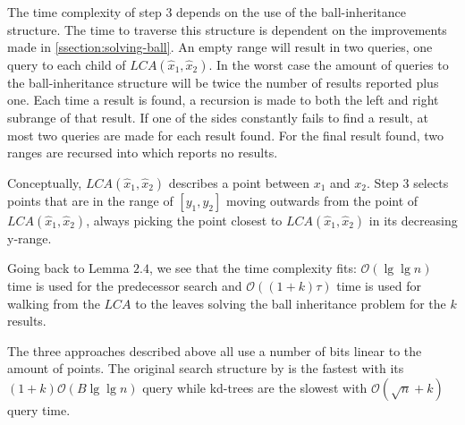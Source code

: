 The time complexity of step $3$ depends on the use of the ball-inheritance structure. The time to traverse this structure is dependent on the improvements made in \ref{ssection:solving-ball}. An empty range will result in two queries, one query to each child of $LCA(\hat{x}_1, \hat{x}_2)$. In the worst case the amount of queries to the ball-inheritance structure will be twice the number of results reported plus one. Each time a result is found, a recursion is made to both the left and right subrange of that result. If one of the sides constantly fails to find a result, at most two queries are made for each result found. For the final result found, two ranges are recursed into which reports no results.

Conceptually, $LCA(\hat{x}_1, \hat{x}_2)$ describes a point between $x_1$ and $x_2$. Step $3$ selects points that are in the range of $[y_1, y_2]$ moving outwards from the point of $LCA(\hat{x}_1, \hat{x}_2)$, always picking the point closest to $LCA(\hat{x}_1, \hat{x}_2)$ in its decreasing y-range. 

Going back to Lemma $2.4$, we see that the time complexity fits: $\mathcal{O}(\lg \lg n)$ time is used for the predecessor search and $\mathcal{O}((1+k)\tau)$ time is used for walking from the $LCA$ to the leaves solving the ball inheritance problem for the $k$ results.

The three approaches described above all use a number of bits  linear to the amount of points. The original search structure by \citet{chanetal} is the fastest with its $(1+k)\mathcal{O}(B\lg \lg n)$ query while kd-trees are the slowest with $\mathcal{O}(\sqrt{n} + k)$ query time.



